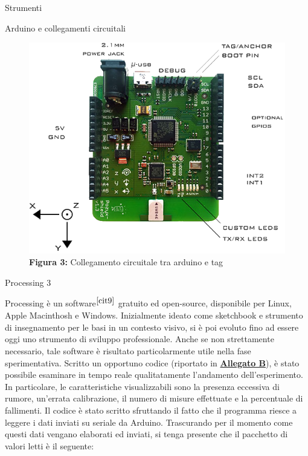\documentclass[12pt]{report}
\begin{document}
\begin{section}{Strumenti}
\begin{subsection}{Arduino e collegamenti circuitali}
		\begin{figure}[h]
			\centering
			\includegraphics[scale=1.2]{pozyx_pins2}
	 		\caption{\textbf{Figura 3:} Collegamento circuitale tra arduino e tag}\label{Fpozyx_pins2}
		\end{figure}

	\end{subsection}

	\begin{subsection}{Processing 3}
	
		Processing è un software$^{{\cite{cit9}}}$ gratuito ed open-source, disponibile per Linux, Apple Macinthosh e Windows. Inizialmente ideato come sketchbook e strumento di insegnamento per le basi in un contesto visivo, si è poi evoluto fino ad essere oggi uno strumento di sviluppo professionale. Anche se non 			strettamente necessario, tale software è risultato particolarmente utile nella fase sperimentativa. Scritto un opportuno codice (riportato in \hyperlink{A2}{\textbf{Allegato B}}), è stato possibile esaminare in tempo reale qualitatamente l'andamento dell’esperimento. In particolare, le caratteristiche visualizzabili 					sono la presenza eccessiva di rumore, un'errata calibrazione, il numero di misure effettuate e la percentuale di fallimenti. Il codice è stato scritto sfruttando il fatto che il programma riesce a leggere i dati inviati su seriale da Arduino. Trascurando per il momento come questi dati vengano elaborati ed inviati, si 					tenga presente che il pacchetto di valori letti è il seguente:
		

\end{subsection}
\end{section}
\end{document}
